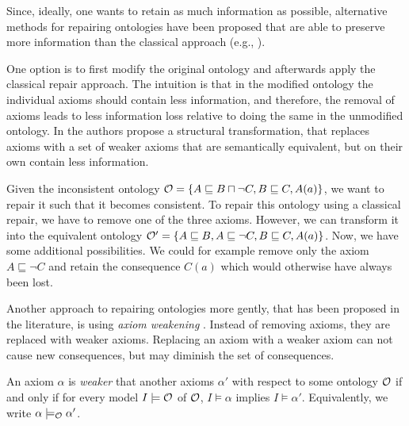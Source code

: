 Since, ideally, one wants to retain as much information as possible, alternative methods for repairing ontologies have been proposed that are able to preserve more information than the classical approach (e.g., \cite{du2014practical,AMAI-2018,baader2018making,troquard2018repairing,confalonieri2020towards,horridge2008laconic,lam2008fine}).

One option is to first modify the original ontology and afterwards apply the classical repair approach. The intuition is that in the modified ontology the individual axioms should contain less information, and therefore, the removal of axioms leads to less information loss relative to doing the same in the unmodified ontology. In \cite{horridge2008laconic} the authors propose a structural transformation, that replaces axioms with a set of weaker axioms that are semantically equivalent, but on their own contain less information.

\begin{example}
  Given the inconsistent ontology $\mathcal{O} = \{ A \sqsubseteq B \sqcap \lnot C, B \sqsubseteq C, A(a) \}$, we want to repair it such that it becomes consistent. To repair this ontology using a classical repair, we have to remove one of the three axioms. However, we can transform it into the equivalent ontology $\mathcal{O}' = \{ A \sqsubseteq B, A \sqsubseteq \lnot C, B \sqsubseteq C, A(a) \}$. Now, we have some additional possibilities. We could for example remove only the axiom $A \sqsubseteq \lnot C$ and retain the consequence $C(a)$ which would otherwise have always been lost.
\end{example}

Another approach to repairing ontologies more gently, that has been proposed in the literature, is using \emph{axiom weakening} \cite{troquard2018repairing,confalonieri2020towards,baader2018making,lam2008fine}. Instead of removing axioms, they are replaced with weaker axioms. Replacing an axiom with a weaker axiom can not cause new consequences, but may diminish the set of consequences.

\begin{definition}
  An axiom $\alpha$ is \emph{weaker} that another axioms $\alpha'$ with respect to some ontology $\mathcal{O}$ if and only if for every model $I \models \mathcal{O}$ of $\mathcal{O}$, $I \models \alpha$ implies $I \models \alpha'$. Equivalently, we write $\alpha \models_\mathcal{O} \alpha'$.
\end{definition}

